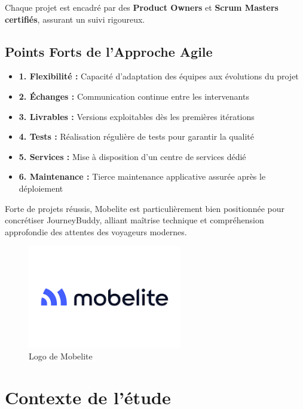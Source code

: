 Chaque projet est encadré par des \textbf{Product Owners} et \textbf{Scrum Masters certifiés}, assurant un suivi rigoureux.

\subsection{Points Forts de l’Approche Agile}

\begin{itemize}
    \item \textbf{1. Flexibilité :} Capacité d’adaptation des équipes aux évolutions du projet
    \item \textbf{2. Échanges :} Communication continue entre les intervenants
    \item \textbf{3. Livrables :} Versions exploitables dès les premières itérations
    \item \textbf{4. Tests :} Réalisation régulière de tests pour garantir la qualité
    \item \textbf{5. Services :} Mise à disposition d’un centre de services dédié
    \item \textbf{6. Maintenance :} Tierce maintenance applicative assurée après le déploiement
\end{itemize}

Forte de projets réussis, Mobelite est particulièrement bien positionnée pour concrétiser JourneyBuddy, alliant maîtrise technique et compréhension approfondie des attentes des voyageurs modernes.

\begin{figure}[h]
\centering
\includegraphics[width=0.6\textwidth]{logos/mobelite.png}
\caption{Logo de Mobelite}
\label{fig:mobelite}
\end{figure}

\newpage

\section{Contexte de l'étude}

